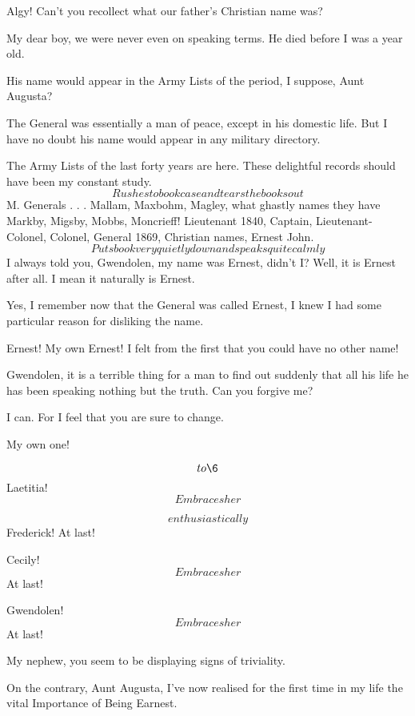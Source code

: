 \documentclass{book}
\begin{document}
\1  Algy!  Can't you recollect what our father's Christian name
was?

\2  My dear boy, we were never even on speaking terms.  He
died before I was a year old.

\1  His name would appear in the Army Lists of the period, I
suppose, Aunt Augusta?

\3  The General was essentially a man of peace, except
in his domestic life.  But I have no doubt his name would appear in
any military directory.

\1  The Army Lists of the last forty years are here.  These
delightful records should have been my constant study.  \[Rushes to
bookcase and tears the books out\]  M. Generals . . . Mallam,
Maxbohm, Magley, what ghastly names they have \textemdash Markby, Migsby,
Mobbs, Moncrieff!  Lieutenant 1840, Captain, Lieutenant-Colonel,
Colonel, General 1869, Christian names, Ernest John.  \[Puts book
very quietly down and speaks quite calmly\]  I always told you,
Gwendolen, my name was Ernest, didn't I?  Well, it is Ernest after
all.  I mean it naturally is Ernest.

\3  Yes, I remember now that the General was called
Ernest, I knew I had some particular reason for disliking the name.

\4  Ernest!  My own Ernest!  I felt from the first that you
could have no other name!

\1  Gwendolen, it is a terrible thing for a man to find out
suddenly that all his life he has been speaking nothing but the
truth.  Can you forgive me?

\4  I can.  For I feel that you are sure to change.

\1  My own one!

\7  \[to \6\]  Laetitia!  \[Embraces her\]

\6  \[enthusiastically\]  Frederick!  At last!

\2  Cecily!  \[Embraces her\]  At last!

\1  Gwendolen!  \[Embraces her\]  At last!

\3  My nephew, you seem to be displaying signs of
triviality.

\1  On the contrary, Aunt Augusta, I've now realised for the
first time in my life the vital Importance of Being Earnest.

\spatium {2\leading}
\endDrama
\end{document}
